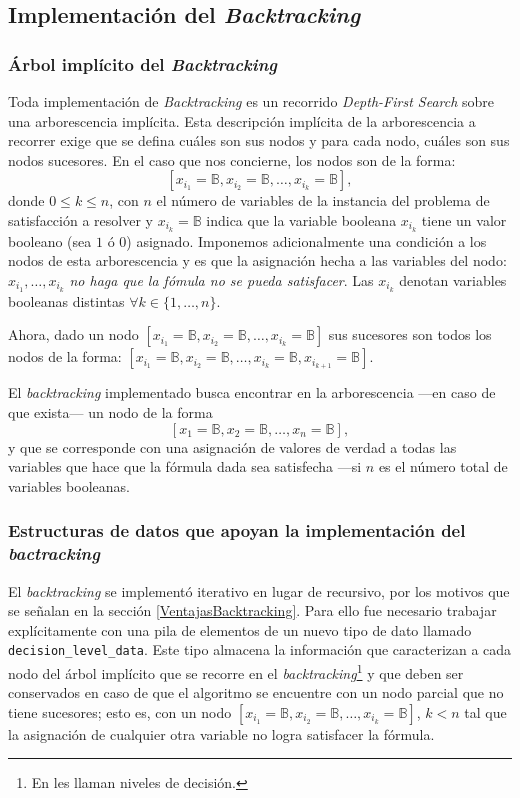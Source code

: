 \documentclass[12pt,lettersize,oneside]{article}
\begin{document}
\subsection{Implementación del \emph{Backtracking}}
\subsubsection{\'Arbol implícito del \emph{Backtracking}}\label{backtracking}
Toda implementación de \emph{Backtracking} es un recorrido \emph{Depth-First
  Search} sobre una arborescencia implícita. Esta descripción implícita de la
arborescencia a recorrer exige que se defina cuáles son sus nodos y para cada
nodo, cuáles son sus nodos sucesores. En el caso que nos concierne, los nodos
son de la forma:
\[[x_{i_1}=\mathbb{B},x_{i_2}=\mathbb{B},\ldots, x_{i_k} = \mathbb{B} ], \]
donde $0\leq k \leq n$, con $n$ el número de variables de la instancia del
problema de satisfacción a resolver y $x_{i_k}=\mathbb{B}$ indica que la
variable booleana $x_{i_k}$ tiene un valor booleano (sea $1$ ó $0$)
asignado. Imponemos adicionalmente una condición a los nodos de esta
arborescencia y es que la asignación hecha a las variables del nodo:
$x_{i_1},\ldots,x_{i_k}$ \emph{no haga que la fómula no se pueda
  satisfacer}. Las $x_{i_k}$ denotan variables booleanas distintas $\forall k
\in \{1,\ldots,n\}$.

Ahora, dado un nodo $[x_{i_1}=\mathbb{B},x_{i_2}=\mathbb{B},\ldots, x_{i_k} =
\mathbb{B} ]$ sus sucesores son todos los nodos de la forma:
$[x_{i_1}=\mathbb{B},x_{i_2}=\mathbb{B},\ldots, x_{i_k} = \mathbb{B},
x_{i_{k+1}}=\mathbb{B} ]$.

El \emph{backtracking} implementado busca encontrar en la arborescencia ---en
caso de que exista--- un nodo de la forma
\[[x_{1}=\mathbb{B},x_{2}=\mathbb{B},\ldots, x_{n} = \mathbb{B} ], \] y que se
corresponde con una asignación de valores de verdad a todas las variables que
hace que la fórmula dada sea satisfecha ---si $n$ es el número total de
variables booleanas.
\vspace{-2.5mm}

\subsubsection{Estructuras de datos que apoyan la implementación del \emph{bactracking}}
El \emph{backtracking} se implementó iterativo en lugar de recursivo, por los
motivos que se señalan en la sección \ref{VentajasBacktracking}. Para ello fue
necesario trabajar explícitamente con una pila de elementos de un nuevo tipo de
dato llamado {\tt decision\_level\_data}. Este tipo almacena la información que
caracterizan a cada nodo del árbol implícito que se recorre en el
\emph{backtracking}\footnote{En \cite{Zhang} les llaman niveles de decisión.} y
que deben ser conservados en caso de que el algoritmo se encuentre con un nodo
parcial que no tiene sucesores; esto es, con un nodo
$[x_{i_1}=\mathbb{B},x_{i_2}=\mathbb{B},\ldots, x_{i_k} = \mathbb{B} ]$, $k< n$
tal que la asignación de cualquier otra variable no logra satisfacer la fórmula.
\end{document}
